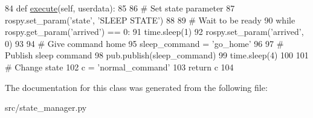 \begin{DoxyCode}
84     \textcolor{keyword}{def }\hyperlink{classstate__manager_1_1MIRO__Sleep_acda704c667aad40c16f10d7c705b1b2e}{execute}(self, userdata):
85 
86         \textcolor{comment}{# Set state parameter}
87         rospy.set\_param(\textcolor{stringliteral}{'state'}, \textcolor{stringliteral}{'SLEEP STATE'})
88 
89         \textcolor{comment}{# Wait to be ready}
90         \textcolor{keywordflow}{while} rospy.get\_param(\textcolor{stringliteral}{'arrived'}) == 0:
91             time.sleep(1)
92         rospy.set\_param(\textcolor{stringliteral}{'arrived'}, 0)
93 
94         \textcolor{comment}{# Give command home}
95         sleep\_command = \textcolor{stringliteral}{'go\_home'}
96 
97         \textcolor{comment}{# Publish sleep command}
98         pub.publish(sleep\_command)
99         time.sleep(4)
100 
101         \textcolor{comment}{# Change state}
102         c = \textcolor{stringliteral}{'normal\_command'}
103         \textcolor{keywordflow}{return} c
104 
\end{DoxyCode}


The documentation for this class was generated from the following file\+:\begin{DoxyCompactItemize}
\item 
src/state\+\_\+manager.\+py\end{DoxyCompactItemize}
